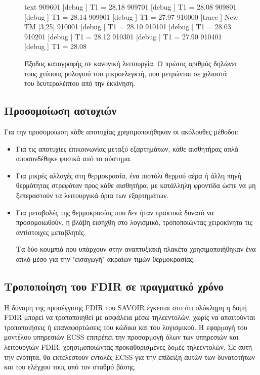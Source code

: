 \documentclass[a4paper,nobib]{tufte-book}
\begin{document}
\begin{figure}
\begin{cminted}{text}
909601  [debug  ] T1 = 28.18
909701  [debug  ] T1 = 28.08
909801  [debug  ] T1 = 28.14
909901  [debug  ] T1 = 27.97
910000  [trace  ] New TM [3,25]
910001  [debug  ] T1 = 28.10
910101  [debug  ] T1 = 28.03
910201  [debug  ] T1 = 28.12
910301  [debug  ] T1 = 27.90
910401  [debug  ] T1 = 28.08
\end{cminted}
\caption[Έξοδος καταγραφής σε κανονική λειτουργία]{Έξοδος καταγραφής σε κανονική λειτουργία. Ο πρώτος αριθμός δηλώνει τους χτύπους ρολογιού του μικροελεγκτή, που μετρώνται σε χιλιοστά του δευτερολέπτου από την εκκίνηση.}
\label{fig:lognominal}
\end{figure}

\subsection{Προσομοίωση αστοχιών}

Για την προσομοίωση κάθε αποτυχίας χρησιμοποιήθηκαν οι ακόλουθες μέθοδοι:
\begin{itemize}
	\item Για τις αποτυχίες επικοινωνίας μεταξύ εξαρτημάτων, κάθε αισθητήρας απλά αποσυνδέθηκε φυσικά από το σύστημα.
	\item Για μικρές αλλαγές στη θερμοκρασία, ένα πιστόλι θερμού αέρα ή άλλη πηγή θερμότητας στρεφόταν προς κάθε αισθητήρα, με κατάλληλη φροντίδα ώστε να μη ξεπεραστούν τα λειτουργικά όρια των εξαρτημάτων.
	\item Για μεταβολές της θερμοκρασίας που δεν ήταν πρακτικά δυνατό να προσομοιωθούν, η βλάβη εισήχθη στο λογισμικό, τροποποιώντας χειροκίνητα τις αντίστοιχες μεταβλητές.
	
	Τα δύο κουμπιά που υπάρχουν στην αναπτυξιακή πλακέτα χρησιμοποιήθηκαν ένα απλό μέσο για την "εισαγωγή" ακραίων τιμών θερμοκρασίας.
\end{itemize}

\subsection{Τροποποίηση του \acs{FDIR} σε πραγματικό χρόνο}

Η δύναμη της προσέγγισης \ac{FDIR} του \acs{SAVOIR} έγκειται στο ότι ολόκληρη η δομή \ac{FDIR} μπορεί να τροποποιηθεί με ασφάλεια μέσω τηλεεντολών, χωρίς να απαιτούνται τροποποιήσεις ή επαναφορτώσεις του κώδικα και του λογισμικού. Η εφαρµογή του μοντέλου υπηρεσιών \acs{ECSS} επιτρέπει την προσαρµογή όλων των υπηρεσιών και λειτουργιών \ac{FDIR}, χρησιµοποιώντας προκαθορισµένες δοµές τηλεεντολών. Σε αυτή την ενότητα, θα εκτελεστούν εντολές \acs{ECSS} για την επίδειξη αυτών των δυνατοτήτων και του ελέγχου τους από τον σταθμό βάσης.
\end{document}
